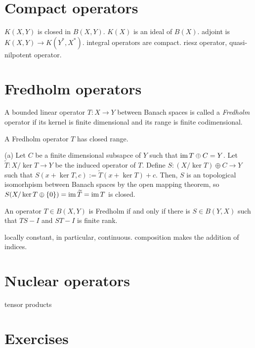 \documentclass{../../large}
\begin{document}
\section{Compact operators}

$K(X,Y)$ is closed in $B(X,Y)$.
$K(X)$ is an ideal of $B(X)$.
adjoint is $K(X,Y)\to K(Y^*,X^*)$.
integral operators are compact.
riesz operator, quasi-nilpotent operator.




\section{Fredholm operators}

\begin{prb}
A bounded linear operator $T:X\to Y$ between Banach spaces is called a \emph{Fredholm} operator if its kernel is finite dimensional and its range is finite codimensional.
\begin{parts}
\item A Fredholm operator $T$ has closed range.
\end{parts}
\end{prb}
\begin{pf}
(a)
Let $C$ be a finite dimensional subsapce of $Y$ such that $\operatorname{im} T\oplus C=Y$.
Let $\tilde T:X/\ker T\to Y$ be the induced operator of $T$.
Define $S:(X/\ker T)\oplus C\to Y$ such that $S(x+\ker T,c):=\tilde T(x+\ker T)+c$.
Then, $S$ is an topological isomorhpism between Banach spaces by the open mapping theorem, so $S(X/\ker T\oplus\{0\})=\operatorname{im}\widetilde T=\operatorname{im} T$ is closed.
\end{pf}

\begin{prb}
An operator $T\in B(X,Y)$ is Fredholm if and only if there is $S\in B(Y,X)$ such that $TS-I$ and $ST-I$ is finite rank.
\end{prb}

\begin{prb}
locally constant, in particular, continuous.
composition makes the addition of indices.
\end{prb}

\section{Nuclear operators}
tensor products





\section*{Exercises}
\end{document}
